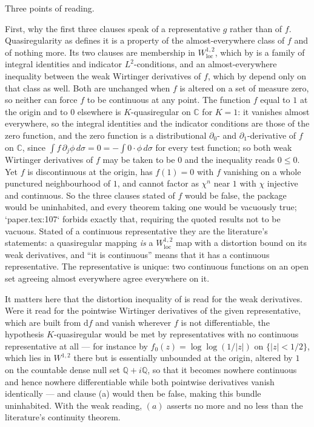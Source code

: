 \begin{definition}
Three points of reading.

First, why the first three clauses speak of a representative $g$ rather than
of $f$.  Quasiregularity as  defines it is a property
of the almost-everywhere class of $f$ and of nothing more.  Its two clauses
are membership in $W^{1,2}_{\mathrm{loc}}$, which by  is a
family of integral identities and indicator $L^2$-conditions, and an
almost-everywhere inequality between the weak Wirtinger derivatives of $f$,
which by  depend only on that class as well.  Both
are unchanged when $f$ is altered on a set of measure zero, so neither can
force $f$ to be continuous at any point.  The function $f$ equal to $1$ at the
origin and to $0$ elsewhere is $K$-quasiregular on $\mathbb{C}$ for $K=1$: it
vanishes almost everywhere, so the integral identities and the indicator
conditions are those of the zero function, and the zero function is a
distributional $\partial_0$- and $\partial_1$-derivative of $f$ on
$\mathbb{C}$, since $\int f\,\partial_j\phi\,d\sigma=0=-\int0\cdot\phi\,
d\sigma$ for every test function; so both weak Wirtinger derivatives of $f$
may be taken to be $0$ and the inequality reads $0\le0$.  Yet $f$ is
discontinuous at the origin, has $f(1)=0$ with $f$ vanishing on a whole
punctured neighbourhood of $1$, and cannot factor as $\chi^n$ near $1$ with
$\chi$ injective and continuous.  So the three clauses stated of $f$ would be
false, the package would be uninhabited, and every theorem taking one would be
vacuously true; `paper.tex:107` forbids exactly that, requiring the quoted
results not to be vacuous.  Stated of a continuous representative they are the
literature's statements: a quasiregular mapping \emph{is} a
$W^{1,2}_{\mathrm{loc}}$ map with a distortion bound on its weak derivatives,
and ``it is continuous'' means that it has a continuous representative.  The
representative is unique: two continuous functions on an open set agreeing
almost everywhere agree everywhere on it.

It matters here that the distortion inequality of  is
read for the weak derivatives.  Were it read for the pointwise Wirtinger
derivatives of the given representative, which are built from
$\mathrm{d}f$ and vanish wherever $f$ is not differentiable, the hypothesis
$K$-quasiregular would be met by representatives with no continuous
representative at all --- for instance by $f_0(z)=\log\log(1/|z|)$ on
$\{|z|<1/2\}$, which lies in $W^{1,2}$ there but is essentially unbounded at
the origin, altered by $1$ on the countable dense null set
$\mathbb{Q}+i\mathbb{Q}$, so that it becomes nowhere continuous and hence
nowhere differentiable while both pointwise derivatives vanish identically ---
and clause (a) would then be false, making this bundle uninhabited.  With the
weak reading, $(a)$ asserts no more and no less than the literature's
continuity theorem.


\end{definition}
